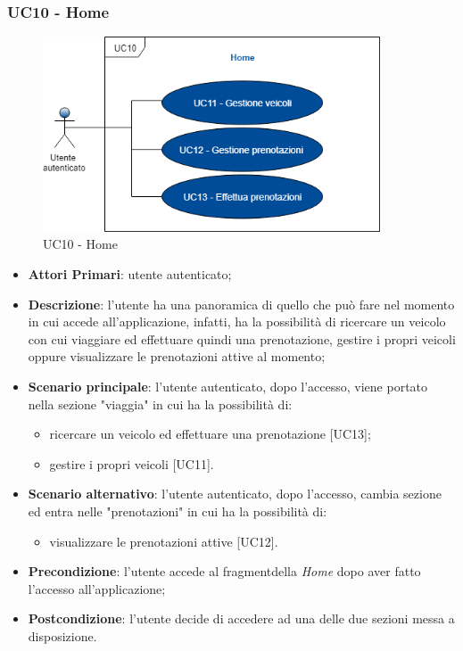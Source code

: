  \subsubsection{UC10 - Home}
  \begin{figure}[H]
 	\includegraphics[width=10cm]{res/images/UC10-Home.png}
 	\centering
 	\caption{UC10 - Home}
 \end{figure}
 \begin{itemize}
 	\item \textbf{Attori Primari}: utente autenticato;
 	\item \textbf{Descrizione}: l'utente ha una panoramica di quello che può fare nel momento in cui accede all'applicazione, infatti, ha la possibilità di ricercare un veicolo con cui viaggiare ed effettuare quindi una prenotazione, gestire i propri veicoli oppure visualizzare le prenotazioni attive al momento;
 	\item \textbf{Scenario principale}: l'utente autenticato, dopo l'accesso, viene portato nella sezione "viaggia" in cui ha la possibilità di:
 	\begin{itemize}
 		\item ricercare un veicolo ed effettuare una prenotazione [UC13];
 		\item gestire i propri veicoli [UC11].
 	\end{itemize}
 	\item \textbf{Scenario alternativo}: l'utente autenticato, dopo l'accesso, cambia sezione ed entra nelle "prenotazioni" in cui ha la possibilità di:
	 	\begin{itemize}
	 		\item visualizzare le prenotazioni attive [UC12]. 
	 	\end{itemize}
 	\item \textbf{Precondizione}: l'utente accede al fragment\glosp della \textit{Home} dopo aver fatto l'accesso all'applicazione;
 	\item \textbf{Postcondizione}: l'utente decide di accedere ad una delle due sezioni messa a disposizione.
 \end{itemize}